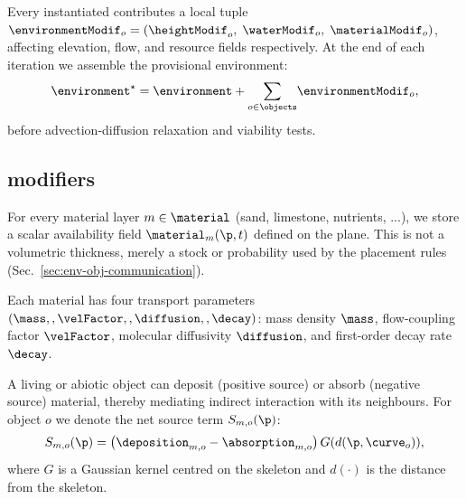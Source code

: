 
\section{}
\label{sec:env-obj-materials}

Every instantiated  contributes a local  tuple $\environmentModif_o=(\heightModif_o, \;\waterModif_o, \;\materialModif_o)$, affecting elevation, flow, and resource fields respectively. At the end of each iteration we assemble the provisional environment:
\begin{align}
\environment^{\star} = \environment + {\sum_{o\in\objects}}\environmentModif_o,
\end{align}
before advection-diffusion relaxation and viability tests.

\subsection{ modifiers}

For every material layer $m \in \material$ (sand, limestone, nutrients, ...), we store a scalar availability field $\material_m(\p,t)$ defined on the plane. This is not a volumetric thickness, merely a stock or probability used by the placement rules (Sec.~\ref{sec:env-obj-communication}).

Each material has four transport parameters $(\mass,,\velFactor,,\diffusion,,\decay)$: mass density $\mass$, flow-coupling factor $\velFactor$, molecular diffusivity $\diffusion$, and first-order decay rate $\decay$.

A living or abiotic object can deposit (positive source) or absorb (negative source) material, thereby mediating indirect interaction with its neighbours. For object $o$ we denote the net source term $S_{m,o}(\p)$:
\begin{align}
S_{m,o}(\p) = \left(\deposition_{m,o} - \absorption_{m,o}\right) G(d(\p,\curve_o)),
\end{align}
where $G$ is a Gaussian kernel centred on the skeleton and $d(\cdot)$ is the distance from the skeleton.

